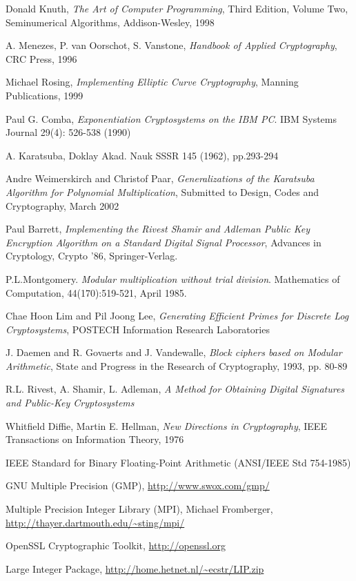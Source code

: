 \documentclass[b5paper]{book}
\begin{document}
\backmatter
\appendix
\begin{thebibliography}{ABCDEF}
Donald Knuth, \textit{The Art of Computer Programming}, Third Edition, Volume Two, Seminumerical Algorithms, Addison-Wesley, 1998

A. Menezes, P. van Oorschot, S. Vanstone, \textit{Handbook of Applied Cryptography}, CRC Press, 1996

Michael Rosing, \textit{Implementing Elliptic Curve Cryptography}, Manning Publications, 1999

Paul G. Comba, \textit{Exponentiation Cryptosystems on the IBM PC}. IBM Systems Journal 29(4): 526-538 (1990)

A. Karatsuba, Doklay Akad. Nauk SSSR 145 (1962), pp.293-294

Andre Weimerskirch and Christof Paar, \textit{Generalizations of the Karatsuba Algorithm for Polynomial Multiplication}, Submitted to Design, Codes and Cryptography, March 2002

Paul Barrett, \textit{Implementing the Rivest Shamir and Adleman Public Key Encryption Algorithm on a Standard Digital Signal Processor}, Advances in Cryptology, Crypto '86, Springer-Verlag.

P.L.Montgomery. \textit{Modular multiplication without trial division}. Mathematics of Computation, 44(170):519-521, April 1985.

Chae Hoon Lim and Pil Joong Lee, \textit{Generating Efficient Primes for Discrete Log Cryptosystems}, POSTECH Information Research Laboratories

J. Daemen and R. Govaerts and J. Vandewalle, \textit{Block ciphers based on Modular Arithmetic}, State and {P}rogress in the {R}esearch of {C}ryptography, 1993, pp. 80-89

R.L. Rivest, A. Shamir, L. Adleman, \textit{A Method for Obtaining Digital Signatures and Public-Key Cryptosystems}

Whitfield Diffie, Martin E. Hellman, \textit{New Directions in Cryptography}, IEEE Transactions on Information Theory, 1976

IEEE Standard for Binary Floating-Point Arithmetic (ANSI/IEEE Std 754-1985)

GNU Multiple Precision (GMP), \url{http://www.swox.com/gmp/}

Multiple Precision Integer Library (MPI), Michael Fromberger, \url{http://thayer.dartmouth.edu/~sting/mpi/}

OpenSSL Cryptographic Toolkit, \url{http://openssl.org}

Large Integer Package, \url{http://home.hetnet.nl/~ecstr/LIP.zip}

\end{thebibliography}


\end{document}
